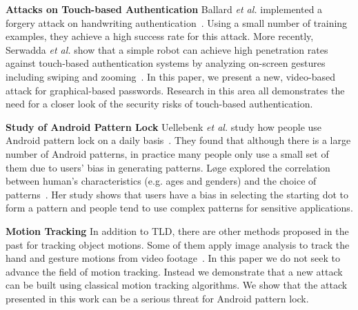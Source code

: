 \noindent \textbf{Attacks on Touch-based Authentication}
Ballard \emph{et al.} implemented a forgery attack on handwriting
authentication~\cite{ballard2007forgery}. Using a small number of training
examples, they achieve a high success rate for this attack. More recently,
Serwadda \emph{et al.} show that a simple robot can achieve high penetration
rates against touch-based authentication systems by analyzing on-screen gestures including
swiping and zooming~\cite{serwadda2013kids}.
In this paper, we present a new, video-based attack for graphical-based passwords.
Research in this area all demonstrates the need for a closer look of the security risks of touch-based authentication.



\noindent \textbf{Study of Android Pattern Lock}
Uellebenk \emph{et al.} study how people use Android pattern lock on
a daily basis~\cite{uellenbeck2013quantifying}.  They found that although there
is a large number of Android patterns, in
practice many people only use a small set of them due to users' bias in
generating patterns. L{\o}ge explored the correlation between
human's characteristics (e.g. ages and genders) and the choice of
patterns~\cite{alpnorway}. Her study shows that users have a bias in selecting the
starting dot to form a pattern and people tend to use complex patterns
for sensitive applications.

\noindent \textbf{Motion Tracking} In addition to TLD, there are other methods proposed in the past for tracking object
motions. Some of them apply image analysis to track the hand and gesture
motions from video
footage~\cite{Yang:2002:EMT:605089.605095,Stenger:2006:MHT:1159166.1159342,
citeulike:13091082}. In this paper we do not seek to advance the field of
motion tracking. Instead we demonstrate that a new attack can be built
using classical motion tracking algorithms. We show that the attack presented in
this work can be a serious threat for Android pattern lock. %


